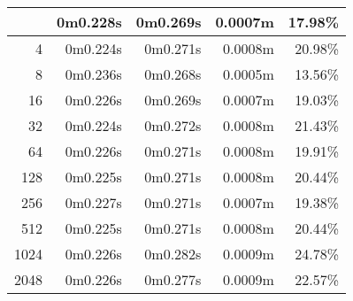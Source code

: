 \documentclass[documentation.tex]{subfiles}
\begin{document}
\begin{longtable}{|r|r|r|r|r|}
        \hline \hline
        \endlastfoot
        \hline
        2                                                   & 0m0.228s                      & 0m0.269s                          & {\color[HTML]{32CB00} 0.0007m}    & {\color[HTML]{32CB00} 17.98\%}     \\ \hline
        4                                                   & 0m0.224s                      & 0m0.271s                          & {\color[HTML]{32CB00} 0.0008m}    & {\color[HTML]{32CB00} 20.98\%}     \\ \hline
        8                                                   & 0m0.236s                      & 0m0.268s                          & {\color[HTML]{32CB00} 0.0005m}    & {\color[HTML]{32CB00} 13.56\%}     \\ \hline
        16                                                  & 0m0.226s                      & 0m0.269s                          & {\color[HTML]{32CB00} 0.0007m}    & {\color[HTML]{32CB00} 19.03\%}     \\ \hline
        32                                                  & 0m0.224s                      & 0m0.272s                          & {\color[HTML]{32CB00} 0.0008m}    & {\color[HTML]{32CB00} 21.43\%}     \\ \hline
        64                                                  & 0m0.226s                      & 0m0.271s                          & {\color[HTML]{32CB00} 0.0008m}    & {\color[HTML]{32CB00} 19.91\%}     \\ \hline
        128                                                 & 0m0.225s                      & 0m0.271s                          & {\color[HTML]{32CB00} 0.0008m}    & {\color[HTML]{32CB00} 20.44\%}     \\ \hline
        256                                                 & 0m0.227s                      & 0m0.271s                          & {\color[HTML]{32CB00} 0.0007m}    & {\color[HTML]{32CB00} 19.38\%}     \\ \hline
        512                                                 & 0m0.225s                      & 0m0.271s                          & {\color[HTML]{32CB00} 0.0008m}    & {\color[HTML]{32CB00} 20.44\%}     \\ \hline
        1024                                                & 0m0.226s                      & 0m0.282s                          & {\color[HTML]{32CB00} 0.0009m}    & {\color[HTML]{32CB00} 24.78\%}     \\ \hline
        2048                                                & 0m0.226s                      & 0m0.277s                          & {\color[HTML]{32CB00} 0.0009m}    & {\color[HTML]{32CB00} 22.57\%}     \\ \hline

\end{longtable}
\end{document}
